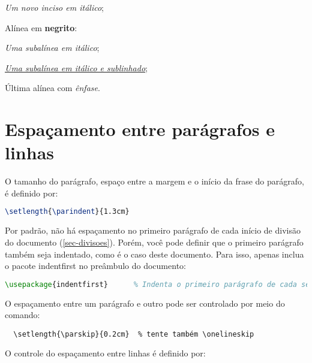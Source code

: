 \begin{alineas}
  \begin{incisos}
    \item \textit{Um novo inciso em itálico};
  \end{incisos}

  \item Alínea em \textbf{negrito}:

  \begin{subalineas}
    \item \textit{Uma subalínea em itálico};
    \item \underline{\textit{Uma subalínea em itálico e sublinhado}};
  \end{subalineas}

  \item Última alínea com \emph{ênfase}.

\end{alineas}

\section{Espaçamento entre parágrafos e linhas}

O tamanho do parágrafo, espaço entre a margem
e o início da frase do parágrafo, é definido por:

\begin{lstlisting}[language=tex]
   \setlength{\parindent}{1.3cm}
\end{lstlisting}

Por padrão, não há espaçamento no
primeiro parágrafo de cada início de divisão do documento
(\autoref{sec-divisoes}). Porém, você pode definir que o primeiro parágrafo
também seja indentado, como é o caso deste documento. Para isso, apenas inclua o
pacote \textsf{indentfirst} no preâmbulo do documento:

\begin{lstlisting}[language=tex]
   \usepackage{indentfirst}      % Indenta o primeiro parágrafo de cada seção.
\end{lstlisting}

O espaçamento entre um parágrafo e outro
pode ser controlado por meio do comando:

\begin{verbatim}
  \setlength{\parskip}{0.2cm}  % tente também \onelineskip
\end{verbatim}

O controle do espaçamento entre linhas é
definido por:

